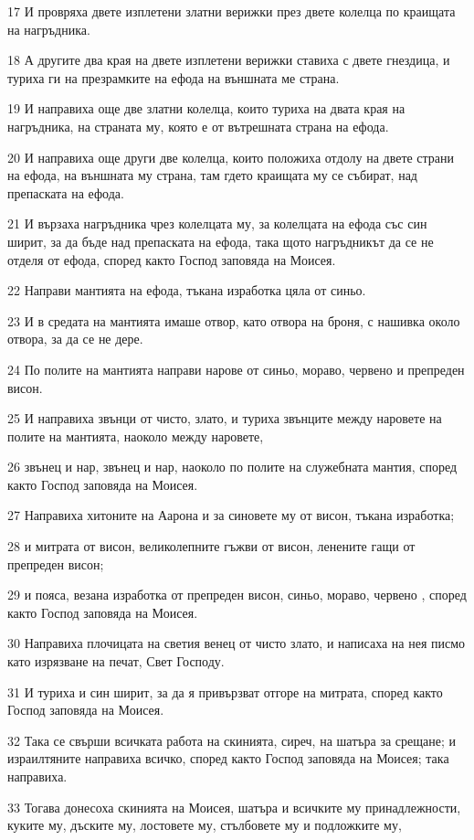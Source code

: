 \par 17 И провряха двете изплетени златни верижки през двете колелца по краищата на нагръдника.
\par 18 А другите два края на двете изплетени верижки ставиха с двете гнездица, и туриха ги на презрамките на ефода на външната ме страна.
\par 19 И направиха още две златни колелца, които туриха на двата края на нагръдника, на страната му, която е от вътрешната страна на ефода.
\par 20 И направиха още други две колелца, които положиха отдолу на двете страни на ефода, на външната му страна, там гдето краищата му се събират, над препаската на ефода.
\par 21 И вързаха нагръдника чрез колелцата му, за колелцата на ефода със син ширит, за да бъде над препаската на ефода, така щото нагръдникът да се не отделя от ефода, според както Господ заповяда на Моисея.
\par 22 Направи мантията на ефода, тъкана изработка цяла от синьо.
\par 23 И в средата на мантията имаше отвор, като отвора на броня, с нашивка около отвора, за да се не дере.
\par 24 По полите на мантията направи нарове от синьо, мораво, червено и препреден висон.
\par 25 И направиха звънци от чисто, злато, и туриха звънците между наровете на полите на мантията, наоколо между наровете,
\par 26 звънец и нар, звънец и нар, наоколо по полите на служебната мантия, според както Господ заповяда на Моисея.
\par 27 Направиха хитоните на Аарона и за синовете му от висон, тъкана изработка;
\par 28 и митрата от висон, великолепните гъжви от висон, ленените гащи от препреден висон;
\par 29 и пояса, везана изработка от препреден висон, синьо, мораво, червено , според както Господ заповяда на Моисея.
\par 30 Направиха плочицата на светия венец от чисто злато, и написаха на нея писмо като изрязване на печат, Свет Господу.
\par 31 И туриха и син ширит, за да я привързват отгоре на митрата, според както Господ заповяда на Моисея.
\par 32 Така се свърши всичката работа на скинията, сиреч, на шатъра за срещане; и израилтяните направиха всичко, според както Господ заповяда на Моисея; така направиха.
\par 33 Тогава донесоха скинията на Моисея, шатъра и всичките му принадлежности, куките му, дъските му, лостовете му, стълбовете му и подложките му,
